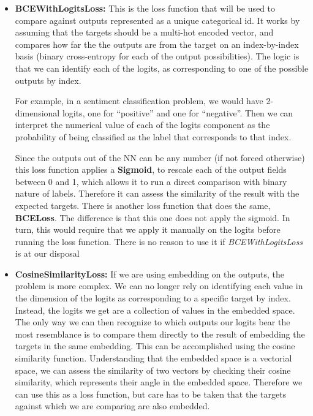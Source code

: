 \documentclass[a4paper, 11pt]{report}
\begin{document}
    \begin{itemize}
        \item \textbf{BCEWithLogitsLoss:} This is the loss function that will be used to compare against outputs represented as a unique categorical id. It works by assuming that the targets should be a multi-hot encoded vector, and compares how far the the outputs are from the target on an index-by-index basis (binary cross-entropy for each of the output possibilities). The logic is that we can identify each of the logits, as corresponding to one of the possible outputs by index.

        For example, in a sentiment classification problem, we would have 2-dimensional logits, one for  ``positive'' and one for ``negative''. Then we can interpret the numerical value of each of the logits component as the probability of being classified as the label that corresponds to that index.

        Since the outputs out of the NN can be any number (if not forced otherwise) this loss function applies a \textbf{Sigmoid}, to rescale each of the output fields between 0 and 1, which allows it to run a direct comparison with binary nature of labels. Therefore it can assess the similarity of the result with the expected targets. There is another loss function that does the same, \textbf{BCELoss}. The difference is that this one does not apply the sigmoid. In turn, this would require that we apply it manually on the logits before running the loss function. There is no reason to use it if \textit{BCEWithLogitsLoss} is at our disposal

        \item \textbf{CosineSimilarityLoss:} If we are using embedding on the outputs, the problem is more complex. We can no longer rely on identifying each value in the dimension of the logits as corresponding to a specific target by index. Instead, the logits we get are a collection of values in the embedded space. The only way we can then recognize to which outputs our logits bear the most resemblance is to compare them directly to the result of embedding the targets in the same embedding. This can be accomplished using the cosine similarity function. Understanding that the embedded space is a vectorial space, we can assess the similarity of two vectors by checking their cosine similarity, which represents their angle in the embedded space. Therefore we can use this as a loss function, but care has to be taken that the targets against which we are comparing are also embedded.
    \end{itemize}
\end{document}
